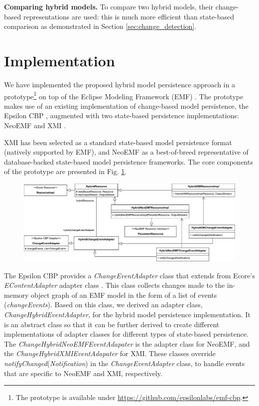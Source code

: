 \documentclass{llncs}
\begin{document}
\textbf{Comparing hybrid models.} To compare two hybrid models, their change-based representations are used: this is much more efficient than state-based comparison as demonstrated in Section \ref{sec:change_detection}.

\section{Implementation}
\label{sec:implementation}

\vspace{-10pt}
We have implemented the proposed hybrid model persistence approach in a prototype\footnote{ The prototype is available under \url{https://github.com/epsilonlabs/emf-cbp}.} on top of the Eclipse Modeling Framework (EMF) \cite{steinberg2008emf}. The prototype makes use of an existing implementation of change-based model persistence, the Epsilon CBP \cite{DBLP:conf/models/YohannisKP17}, augmented with two state-based persistence implementations: NeoEMF \cite{daniel2016neoemf} and XMI%
.

XMI has been selected as a standard state-based model persistence format (natively supported by EMF), and NeoEMF as a best-of-breed representative of database-backed state-based model persistence frameworks. The core components of the prototype are presented in Fig. \ref{fig:class_diagram}. 

\vspace{-10pt}
\begin{figure}[ht]
    \includegraphics[width=\linewidth]{images/class_diagram}
    \label{fig:class_diagram}
\end{figure}

\vspace{-10pt}
The Epsilon CBP provides a \textit{ChangeEventAdapter} class \cite{DBLP:conf/models/YohannisKP17} that extends from Ecore's \textit{EContentAdapter} adapter class%
. This class collects changes made to the in-memory object graph of an EMF model in the form of a list of events (\textit{changeEvents}). Based on this class, we derived an adapter class, \textit{ChangeHybridEventAdapter}, for the hybrid model persistence implementation. It is an abstract class so that it can be further derived to create different implementations of adapter classes for different types of state-based persistence. The \textit{ChangeHybridNeoEMFEventAdapater} is the adapter class for NeoEMF, and the \textit{ChangeHybridXMIEventAdapater} for XMI. These classes override \textit{notifyChanged}(\textit{Notification}) in the \textit{ChangeEventAdapter} class, to handle events that are specific to NeoEMF and XMI, respectively.
\end{document}
